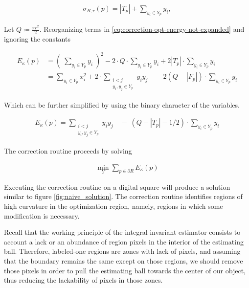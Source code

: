 \documentclass[runningheads]{llncs}
\begin{document}
	\begin{align*}
		\sigma_{R,r}(p) = |T_{p}| + \sum_{y_i \in Y_p}{y_i},
	\end{align*}
	
	Let $Q \coloneqq \frac{\pi r^2}{2}$. Reorganizing terms in \eqref{eq:correction-opt-energy-not-expanded} and ignoring the constants 
	
	\begin{align*}
		E_{\kappa}(p) &= \left( \; \sum_{y_i \in Y_{p}}{y_i} \; \right) ^2 -2 \cdot Q\cdot \sum_{y_i \in Y_{p}}{y_i} + 2 |T_p| \cdot \sum_{ y_i \in Y_{p} }{y_i} \\[1em]
		&= \sum_{y_i \in Y_{p}}{x_i^2} + 2 \cdot \sum_{ \substack{ i<j \\ y_i,y_j \in Y_{p}  } }{y_iy_j} \quad - 2 (Q-|F_p|)\cdot \sum_{y_i \in Y_{p}}{y_i}
	\end{align*}
	
	Which can be further simplified by using the binary character of the variables.
	
	\begin{align*}
		E_{\kappa}(p) =\sum_{ \substack{ i<j \\ y_i,y_j \in Y_{p}  } }{y_iy_j} \quad  - \;(Q-|T_p|-1/2)\cdot \sum_{y_i \in Y_{p}}{y_i}
	\end{align*}	
	
	The correction routine proceeds by solving
	
	\begin{align}
		\min_{Y} \sum_{p \in \partial R}E_{\kappa}(p)
		\label{eq:optimization_problem_no_conn}
	\end{align}
	
	Executing the correction routine on a digital square will produce a solution similar to figure \ref{fig:naive_solution}. The correction routine identifies regions of high curvature in the optimization region, namely, regions in which some modification is necessary. 
	
	
	Recall that the working principle of the integral invariant estimator consists to account a lack or an abundance of region pixels in the interior of the estimating ball. Therefore, labeled-one regions are zones with lack of pixels, and assuming that the boundary remains the same except on those regions, we should remove those pixels in order to pull the estimating ball towards the center of our object, thus reducing the lackability of pixels in those zones.
\end{document}
